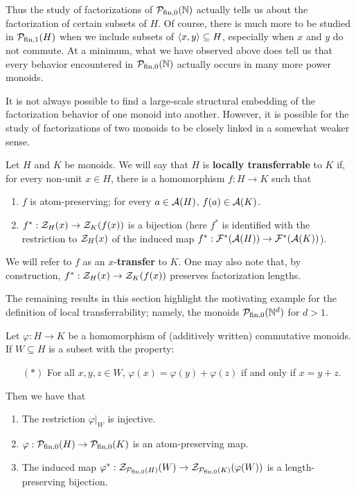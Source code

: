 Thus the study of factorizations of ${\mathcal{P}_{\textrm{fin},0}(\mathbb{N})}$ actually tells us about the factorization of certain subsets of $H$.
Of course, there is much more to be studied in $\mathcal{P}_{\textrm{fin}, 1}(H)$ when we include subsets of $\langle x,y \rangle\subseteq H$, especially when $x$ and $y$ do not commute.
At a minimum, what we have observed above does tell us that every behavior encountered in ${\mathcal{P}_{\textrm{fin},0}(\mathbb{N})}$ actually occurs in many more power monoids.

It is not always possible to find a large-scale structural embedding of the factorization behavior of one monoid into another.  
However, it is possible for the study of factorizations of two monoids to be closely linked in a somewhat weaker sense.

\begin{defn} \label{def:local transfer}
Let $H$ and $K$ be monoids. 
We will say that $H$ is \textbf{locally transferrable} to $K$ if, for every non-unit $x\in H$, there is a homomorphism $f: H \to K$ such that 
\begin{enumerate}[label={\rm (\roman{*})}]
	\item $f$ is atom-preserving; for every $a\in \mathcal{A}(H)$, $f(a)\in \mathcal{A}(K)$.
	\item $f^*:\mathcal{Z}_H(x) \to \mathcal{Z}_K(f(x))$ is a bijection (here $f^*$ is identified with the restriction to $\mathcal{Z}_H(x)$ of the induced map $f^*: \mathcal{F}^*(\mathcal{A}(H)) \to \mathcal{F}^*(\mathcal{A}(K))$).
\end{enumerate}
We will refer to $f$ as an $x$-\textbf{transfer} to $K$.
One may also note that, by construction, $f^*:\mathcal{Z}_H(x) \to \mathcal{Z}_K(f(x))$ preserves factorization lengths.
\end{defn}

The remaining results in this section highlight the motivating example for the definition of local transferrability; namely, the monoids $\mathcal{P}_{\textrm{fin}, 0}(\mathbb{N}^d)$ for $d>1$.

\begin{lemma}\label{lem:local-transport}
Let $\varphi: H \to K$ be a homomorphism of (additively written) commutative monoids. 
If $W\subseteq H$ is a subset with the property:
\begin{itemize}
\item[$(*)$] For all $x,y,z\in W$, $\varphi(x) = \varphi(y) + \varphi(z)$ if and only if $x = y + z$.
\end{itemize}
Then we have that
\begin{enumerate}[label={\rm (\roman{*})}]
\item The restriction $\varphi|_W$ is injective.
\item $\varphi:\mathcal{P}_{\textrm{fin}, 0}(H) \to \mathcal{P}_{\textrm{fin}, 0}(K)$ is an atom-preserving map.
\item The induced map $\varphi^*:\mathcal{Z}_{\mathcal{P}_{\textrm{fin}, 0}(H)}(W) \to \mathcal{Z}_{\mathcal{P}_{\textrm{fin}, 0}(K)}(\varphi(W))$ is a length-preserving bijection.
\end{enumerate}
\end{lemma}

